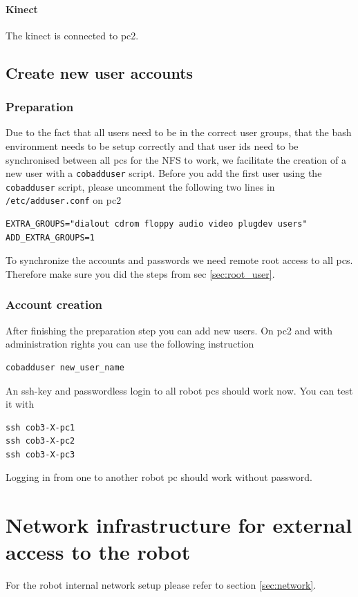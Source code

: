 \paragraph{Kinect}
The kinect is connected to pc2.


\subsection{Create new user accounts}
\subsubsection{Preparation}
\label{sec:account}
Due to the fact that all users need to be in the correct user groups, that the bash environment needs to be setup correctly and that user ids need to be synchronised between all pcs for the NFS to work, we facilitate the creation of a new user with a \texttt{cobadduser} script. Before you add the first user using the \texttt{cobadduser} script, please uncomment the following two lines in \texttt{/etc/adduser.conf} on pc2
\begin{lstlisting}
EXTRA_GROUPS="dialout cdrom floppy audio video plugdev users"
ADD_EXTRA_GROUPS=1
\end{lstlisting}

To synchronize the accounts and passwords we need remote root access to all pcs. Therefore make sure you did the steps from sec \ref{sec:root_user}.

\subsubsection{Account creation}
After finishing the preparation step you can add new users. On pc2 and with administration rights you can use the following instruction
\begin{lstlisting}
cobadduser new_user_name
\end{lstlisting}

An ssh-key and passwordless login to all robot pcs should work now. You can test it with
\begin{lstlisting}
ssh cob3-X-pc1
ssh cob3-X-pc2
ssh cob3-X-pc3
\end{lstlisting}
Logging in from one to another robot pc should work without password.

\section{Network infrastructure for external access to the robot}
For the robot internal network setup please refer to section \ref{sec:network}.

